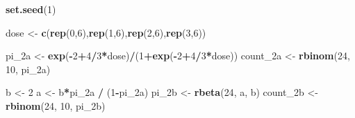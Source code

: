 \documentclass[
]{krantz}
\newenvironment{Shaded}{\begin{snugshade}}{\end{snugshade}}
\newcommand{\DecValTok}[1]{\textcolor[rgb]{0.06,0.06,0.06}{#1}}
\newcommand{\FunctionTok}[1]{\textcolor[rgb]{0.27,0.27,0.27}{\textbf{#1}}}
\newcommand{\NormalTok}[1]{#1}
\newcommand{\OtherTok}[1]{\textcolor[rgb]{0.37,0.37,0.37}{#1}}
\newcommand{\SpecialCharTok}[1]{\textcolor[rgb]{0.43,0.43,0.43}{\textbf{#1}}}
\begin{document}
\begin{Shaded}
\begin{Highlighting}[]
\FunctionTok{set.seed}\NormalTok{(}\DecValTok{1}\NormalTok{)}

\NormalTok{dose }\OtherTok{\textless{}{-}} \FunctionTok{c}\NormalTok{(}\FunctionTok{rep}\NormalTok{(}\DecValTok{0}\NormalTok{,}\DecValTok{6}\NormalTok{),}\FunctionTok{rep}\NormalTok{(}\DecValTok{1}\NormalTok{,}\DecValTok{6}\NormalTok{),}\FunctionTok{rep}\NormalTok{(}\DecValTok{2}\NormalTok{,}\DecValTok{6}\NormalTok{),}\FunctionTok{rep}\NormalTok{(}\DecValTok{3}\NormalTok{,}\DecValTok{6}\NormalTok{))}

\NormalTok{pi\_2a }\OtherTok{\textless{}{-}} \FunctionTok{exp}\NormalTok{(}\SpecialCharTok{{-}}\DecValTok{2}\SpecialCharTok{+}\DecValTok{4}\SpecialCharTok{/}\DecValTok{3}\SpecialCharTok{*}\NormalTok{dose)}\SpecialCharTok{/}\NormalTok{(}\DecValTok{1}\SpecialCharTok{+}\FunctionTok{exp}\NormalTok{(}\SpecialCharTok{{-}}\DecValTok{2}\SpecialCharTok{+}\DecValTok{4}\SpecialCharTok{/}\DecValTok{3}\SpecialCharTok{*}\NormalTok{dose))}
\NormalTok{count\_2a }\OtherTok{\textless{}{-}} \FunctionTok{rbinom}\NormalTok{(}\DecValTok{24}\NormalTok{, }\DecValTok{10}\NormalTok{, pi\_2a)}

\NormalTok{b }\OtherTok{\textless{}{-}} \DecValTok{2}
\NormalTok{a }\OtherTok{\textless{}{-}}\NormalTok{ b}\SpecialCharTok{*}\NormalTok{pi\_2a }\SpecialCharTok{/}\NormalTok{ (}\DecValTok{1}\SpecialCharTok{{-}}\NormalTok{pi\_2a)}
\NormalTok{pi\_2b }\OtherTok{\textless{}{-}} \FunctionTok{rbeta}\NormalTok{(}\DecValTok{24}\NormalTok{, a, b)}
\NormalTok{count\_2b }\OtherTok{\textless{}{-}} \FunctionTok{rbinom}\NormalTok{(}\DecValTok{24}\NormalTok{, }\DecValTok{10}\NormalTok{, pi\_2b)  }
\end{Highlighting}
\end{Shaded}
\end{document}
